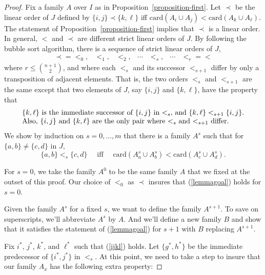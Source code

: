 \documentclass[12pt]{article}
\theoremstyle{definition}
\newcommand{\set}[1]{\{ #1 \}}
\newcommand{\quadiff}{\quad \mbox{ iff } \quad}
\newcommand{\card}{\mbox{card}}
\begin{document}
\begin{proof} 
Fix a family   $A$ over $I$ as in Proposition~\ref{proposition-first}.
Let $\prec$ be the linear order of $J$  defined by
$\set{i,j} \prec \set{k,\ell} $  iff    $ \card(A_i \cup A_j) <  \card(A_k \cup A_{\ell})$.
The statement of Proposition~\ref{proposition-first} implies that $\prec$ is
a linear order.
In general, $< $ and $\prec$ are different
strict linear orders of $J$.
By following the bubble sort algorithm, there is a sequence of strict linear orders of $J$,
\[
\begin{array}{cccccccc}
\prec = <_0 ,
& <_1 ,
& <_2 ,
& \cdots
& <_s,
& \cdots
& <_r = < 
\end{array}
\]
where $r \leq {n+1 \choose 2}$, and where each  $<_s$ and its successor $<_{s+1}$ differ by only a transposition
of adjacent elements.
That is, the two orders  $<_{s}$ and  $<_{s+1}$ are the same except that two elements of 
$J$, say $\set{i,j}$ and $\set{k,\ell}$,  have the property that 
\begin{equation}
\label{ijkl}
\begin{array}{l}
\mbox{$\set{k,\ell}$ is the immediate successor of  $\set{i,j}$ in $<_s$, and  $ \set{k,\ell} <_{s+1} \set{i,j}$.}\\
\mbox{Also, $\set{i,j}$ and $\set{k,\ell}$ are the only pair where $<_s$ and $<_{s+1}$ differ.}
\end{array}
\end{equation}
We show by induction on $s = 0, \ldots, m$ that there is a family $A^s$ such that 
for $\set{a,b} \neq \set{c,d}$ in $J$,
\begin{equation}\label{lemmagoal}
 \set{a,b} <_s \set{c,d} 
 \quadiff
\card(A^{s}_a \cup A^{s}_b ) < \card(A^{s}_c \cup A^{s}_{d}).
 \end{equation}

For $s= 0$, we take the family $A^{0}$ to be  the same family $A$ 
that we fixed at the outset of this proof.  Our choice of $<_0$ as $\prec$ insures that (\ref{lemmagoal}) holds for $s =0$.

Given the family $A^{s}$ for a fixed $s$, we want to define  the family $A^{s+1}$.
To save on superscripts, we'll abbreviate $A^{s}$ by $A$.   And we'll define a new family $B$ and show that it satisfies the 
statement of (\ref{lemmagoal}) for $s+1$ with $B$ replacing $A^{s+1}$.





Fix $i^*$, $j^*$, $k^*$, and $\ell^*$ such that (\ref{ijkl}) holds.
Let $\set{g^*,h^*}$ be the immediate predecessor of $\set{i^*,j^*}$ in $<_s$.
At this point, we need to take a step to insure 
that our family ${A}_x$ has the following extra property:


\end{proof}
\end{document}
